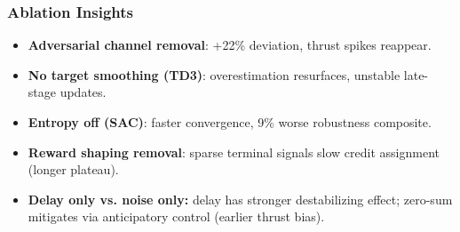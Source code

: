 \begin{frame}
  \frametitle{Ablation Insights}
  \small
  \begin{itemize}\setlength{\itemsep}{4pt}
    \item \textbf{Adversarial channel removal}: +22\% deviation, thrust spikes reappear.
    \item \textbf{No target smoothing (TD3)}: overestimation resurfaces, unstable late-stage updates.
    \item \textbf{Entropy off (SAC)}: faster convergence, 9\% worse robustness composite.
    \item \textbf{Reward shaping removal}: sparse terminal signals slow credit assignment (longer plateau).
    \item \textbf{Delay only vs. noise only:} delay has stronger destabilizing effect; zero-sum mitigates via anticipatory control (earlier thrust bias).
  \end{itemize}
\end{frame}

